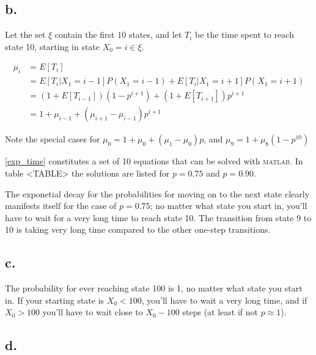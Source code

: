 \subsection*{b.}

Let the set $\xi$ contain the first 10 states, and let $T_i$ be the time spent to reach state 10, starting in state $X_0 = i \in \xi$. 


\begin{equation}
\label{exp_time}
\begin{aligned}
 \mu_i &= E[T_i] \\
       &= E[T_{i}|X_1 = i-1]P(X_1=i-1) + E[T_{i}|X_1 = i+1]P(X_1=i+1) \\
       &= ( 1+E[T_{i-1}] )( 1-p^{i+1} ) + ( 1+E[T_{i+1}] )p^{i+1} \\
       &= 1 + \mu_{i-1} + ( \mu_{i+1} - \mu_{i-1} )p^{i+1}
\end{aligned}
\end{equation}

Note the special cases for $\mu_0 = 1 + \mu_0 + (\mu_1 - \mu_0)p$, and $\mu_9 = 1 + \mu_8(1-p^{10})$

\cref{exp_time} constitutes a set of 10 equations that can be solved with \textsc{matlab}. 
In table <TABLE> the solutions are listed for $p=0.75$ and $p=0.90$.


The exponetial decay for the probabilities for moving on to the next state  clearly manifests itself for the case of $p=0.75$; no matter what state you start in, you'll have to wait for a very long time to reach state 10. The transition from state 9 to 10 is taking very long time compared to the other one-step transitions. 


\subsection*{c.}

The probability for ever reaching state 100 is 1, no matter what state you start in. If your starting state is $X_0<100$, you'll have to wait a very long time, and if $X_0>100$ you'll have to wait close to $X_0 - 100$ steps (at least if not $p \approx 1$).


\subsection*{d.}



